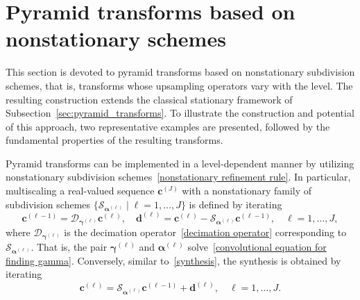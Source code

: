 \documentclass[11pt,a4paper]{article}
\theoremstyle{definition}
\begin{document}

\section{Pyramid transforms based on nonstationary schemes}\label{sec:pyramid}

This section is devoted to pyramid transforms based on nonstationary subdivision schemes, that is, transforms whose upsampling operators vary with the level. The resulting construction extends the classical stationary framework of Subsection~\ref{sec:pyramid_transforms}. To illustrate the construction and potential of this approach, two representative examples are presented, followed by the fundamental properties of the resulting transforms.

Pyramid transforms can be implemented in a level-dependent manner by utilizing nonstationary subdivision schemes~\eqref{nonstationary refinement rule}. In particular, multiscaling a real-valued sequence $\boldsymbol{c}^{(J)}$ with a nonstationary family of subdivision schemes $\{\mathcal{S}_{\boldsymbol{\alpha}^{(\ell)}} \mid  \ell=1,\dots,J\}$ is defined by iterating
\begin{equation} \label{NS multiscale transform}
    \boldsymbol{c}^{(\ell-1)}=\mathcal{D}_{\boldsymbol{\gamma}^{(\ell)}}\boldsymbol{c}^{(\ell)}, \quad \boldsymbol{d}^{(\ell)}=\boldsymbol{c}^{(\ell)}-\mathcal{S}_{\boldsymbol{\alpha}^{(\ell)}}\boldsymbol{c}^{(\ell-1)}, \quad \ell=1,\dots,J,
\end{equation}
where $\mathcal{D}_{\boldsymbol{\gamma}^{(\ell)}}$ is the decimation operator~\eqref{decimation operator} corresponding to $\mathcal{S}_{\boldsymbol{\alpha}^{(\ell)}}$. That is, the pair $\boldsymbol{\gamma}^{(\ell)}$ and $\boldsymbol{\alpha}^{(\ell)}$ solve~\eqref{convolutional equation for finding gamma}. Conversely, similar to~\eqref{synthesis}, the synthesis is obtained by iterating
\begin{equation} \label{NS synthesis}
    \boldsymbol{c}^{(\ell)}= \mathcal{S}_{\boldsymbol{\alpha}^{(\ell)}}\boldsymbol{c}^{(\ell-1)}+\boldsymbol{d}^{(\ell)}, \quad \ell=1,\dots,J.
\end{equation}
\end{document}
